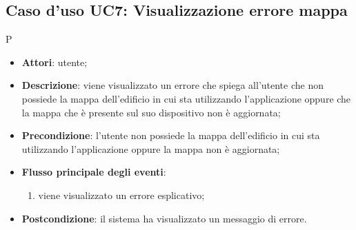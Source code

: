 \documentclass[../AnalisiDeiRequisiti.tex]{subfiles}
\begin{document}
\subsection{Caso d'uso UC7: Visualizzazione errore mappa}P
\begin{itemize}
\item \textbf{Attori}: utente;
\item \textbf{Descrizione}: viene visualizzato un errore che spiega all'utente che non possiede la mappa dell'edificio in cui sta utilizzando l'applicazione oppure che la mappa che è presente sul suo dispositivo non è aggiornata; 
      \item \textbf{Precondizione}: l'utente non possiede la mappa dell'edificio in cui sta utilizzando l'applicazione oppure la mappa non è aggiornata;

        \item \textbf{Flusso principale degli eventi}:
          \begin{enumerate}
          \item viene visualizzato un errore esplicativo;

      \end{enumerate}
    \item \textbf{Postcondizione}: il sistema ha visualizzato un messaggio di errore.
  \end{itemize}
 
 
\end{document}
